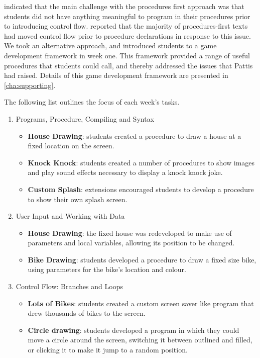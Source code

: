 \citet{Pattis:1990,Pattis:1993} indicated that the main challenge with the procedures first approach was that students did not have anything meaningful to program in their procedures prior to introducing control flow. \citet{Pattis:1993} reported that the majority of procedures-first texts had moved control flow prior to procedure declarations in response to this issue. We took an alternative approach, and introduced students to a game development framework in week one. This framework provided a range of useful procedures that students could call, and thereby addressed the issues that Pattis had raised. Details of this game development framework are presented in \cref{cha:supporting}.

The following list outlines the focus of each week's tasks.
\begin{enumerate}
  \item Programs, Procedure, Compiling and Syntax
  \begin{itemize}[noitemsep,nolistsep]
  	\item \textbf{House Drawing}: students created a procedure to draw a house at a fixed location on the screen.
  	\item \textbf{Knock Knock}: students created a number of procedures to show images and play sound effects necessary to display a knock knock joke.
  	\item \textbf{Custom Splash}: extensions encouraged students to develop a procedure to show their own splash screen.
  \end{itemize}
  \item User Input and Working with Data
  \begin{itemize}[noitemsep,nolistsep]
  	\item \textbf{House Drawing}: the fixed house was redeveloped to make use of parameters and local variables, allowing its position to be changed.
  	\item \textbf{Bike Drawing}: students developed a procedure to draw a fixed size bike, using parameters for the bike's location and colour.
  \end{itemize}
  \item Control Flow: Branches and Loops
  \begin{itemize}[noitemsep,nolistsep]
  	\item \textbf{Lots of Bikes}: students created a custom screen saver like program that drew thousands of bikes to the screen.
  	\item \textbf{Circle drawing}: students developed a program in which they could move a circle around the screen, switching it between outlined and filled, or clicking it to make it jump to a random position.

\end{itemize}
\end{enumerate}
